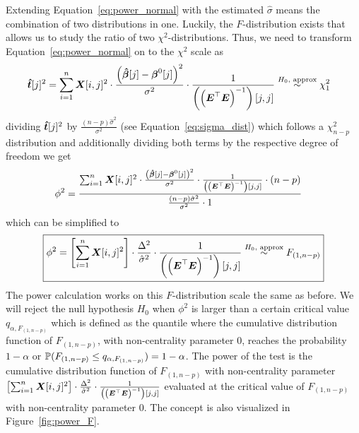 \documentclass[11pt,a4paper,twoside]{book}\usepackage[]{graphicx}\usepackage[]{xcolor}
\begin{document}
Extending Equation~\eqref{eq:power_normal} with the estimated $\hat{\sigma}$ means the combination of two distributions in one. Luckily, the $F$-distribution exists that allows us to study the ratio of two $\chi^2$-distributions.
Thus, we need to transform Equation~\eqref{eq:power_normal} on to the $\chi^2$ scale as
\begin{align*}
\hbt[j]^2 &=\sum_{i=1}^{n}\X[i,j]^2\cdot\frac{\left(\hbbeta[j]-\bbeta^0[j]\right)^2}{\sigma^2}\cdot \frac{1}{ \left(\left(\bE^\top\bE\right)^{-1}\right)[j,j] }\overset{H_0,\text{ approx}}{\sim}\chi^2_{1}
\end{align*}
dividing $\hbt[j]^2 $ by $\frac{(n-p)\hat\sigma^2}{\sigma^2}$ (see Equation~\eqref{eq:sigma_dist}) which follows a $\chi^2_{n-p}$ distribution and additionally dividing both terms by the respective degree of freedom we get
\begin{align*}
\phi^2&=\frac{\sum_{i=1}^{n}\X[i,j]^2\cdot\frac{\left(\hbbeta[j]-\bbeta^0[j]\right)^2}{\sigma^2}\cdot \frac{1}{ \left(\left(\bE^\top\bE\right)^{-1}\right)[j,j] } \cdot (n-p)}{
\frac{(n-p)\hat\sigma^2}{\sigma^2} \cdot 1
}
\end{align*}
which can be simplified to
\begin{align}
\boxed{\phi^2=
\left[\sum_{i=1}^{n}\X[i,j]^2\right]\cdot\frac{\Delta^2}{\hat\sigma^2}\cdot \frac{1}{ \left(\left(\bE^\top\bE\right)^{-1}\right)[j,j] }\overset{H_0,\text{ approx}}{\sim}F_{(1,n-p)}}\label{eq:mypower}
\end{align}
The power calculation works on this $F$-distribution scale the same as before. We will reject the null hypothesis $H_0$ when $\phi^2$ is larger than a certain critical value $q_{\alpha, F_{(1,n-p)}}$ which is defined as the quantile where the cumulative distribution function of $F_{(1,n-p)}$, with non-centrality parameter 0, reaches the probability $1-\alpha$ or $\P(F_{(1,n-p)}\leq q_{\alpha,F_{(1,n-p)}})=1-\alpha$.
The power of the test is the cumulative distribution function of $F_{(1,n-p)}$ with non-centrality parameter $\left[\sum_{i=1}^{n}\X[i,j]^2\right]\cdot\frac{\Delta^2}{\hat\sigma^2}\cdot \frac{1}{ \left(\left(\bE^\top\bE\right)^{-1}\right)[j,j] }$ evaluated at the critical value of $F_{(1,n-p)}$ with non-centrality parameter 0. The concept is also visualized in Figure~\ref{fig:power_F}.
\end{document}
